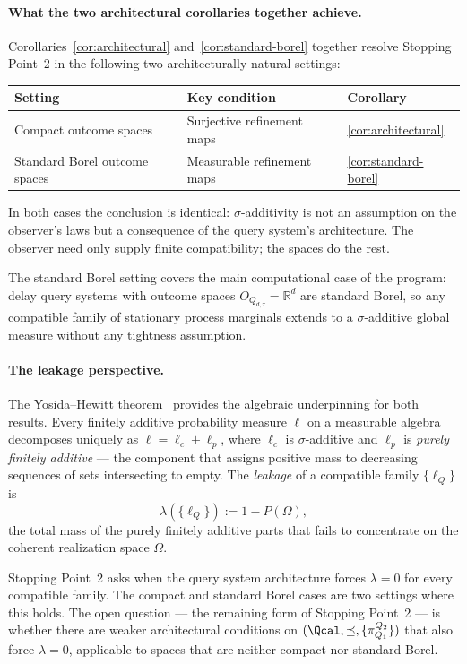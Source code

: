 \paragraph{What the two architectural corollaries together achieve.}
Corollaries~\ref{cor:architectural} and~\ref{cor:standard-borel}
together resolve Stopping Point~2 in the following two architecturally
natural settings:

\begin{center}
\begin{tabular}{lll}
\toprule
Setting & Key condition & Corollary \\
\midrule
Compact outcome spaces & Surjective refinement maps & \ref{cor:architectural} \\
Standard Borel outcome spaces & Measurable refinement maps & \ref{cor:standard-borel} \\
\bottomrule
\end{tabular}
\end{center}

In both cases the conclusion is identical: $\sigma$-additivity is not
an assumption on the observer's laws but a consequence of the query
system's architecture.  The observer need only supply finite
compatibility; the spaces do the rest.

The standard Borel setting covers the main computational case of the
program: delay query systems with outcome spaces $O_{Q_{d,\tau}}
= \mathbb{R}^d$ are standard Borel, so any compatible family of
stationary process marginals extends to a $\sigma$-additive global
measure without any tightness assumption.

\paragraph{The leakage perspective.}
The Yosida--Hewitt theorem~\cite{Dunford1958} provides the
algebraic underpinning for both results.  Every finitely additive
probability measure $\ell$ on a measurable algebra decomposes
uniquely as $\ell = \ell_c + \ell_p$, where $\ell_c$ is
$\sigma$-additive and $\ell_p$ is \emph{purely finitely additive}
--- the component that assigns positive mass to decreasing sequences
of sets intersecting to empty.  The \emph{leakage} of a compatible
family $\{\ell_Q\}$ is
\[
\lambda(\{\ell_Q\}) := 1 - P(\Omega),
\]
the total mass of the purely finitely additive parts that fails to
concentrate on the coherent realization space $\Omega$.

Stopping Point~2 asks when the query system architecture forces
$\lambda = 0$ for every compatible family.  The compact and standard
Borel cases are two settings where this holds.  The open question ---
the remaining form of Stopping Point~2 --- is whether there are
weaker architectural conditions on $(\Qcal, \preceq,
\{\pi^{Q_2}_{Q_1}\})$ that also force $\lambda = 0$, applicable
to spaces that are neither compact nor standard Borel.


